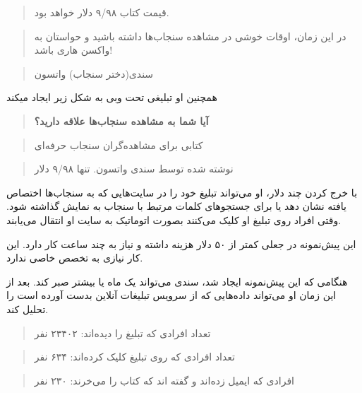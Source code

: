 \begin{quote}
قیمت کتاب ۹/۹۸ دلار خواهد بود.
\end{quote}

\begin{quote}
در این زمان، اوقات خوشی در مشاهده سنجاب‌ها داشته باشید و حواستان به
واکسن هاری باشد!
\end{quote}

\begin{quote}
سندی(دختر سنجاب) واتسون
\end{quote}

همچنین او تبلیغی تحت وبی به شکل زیر ایجاد میکند

\begin{quote}
\textbf{آیا شما به مشاهده سنجاب‌ها علاقه دارید؟}
\end{quote}

\begin{quote}
\end{quote}

\begin{quote}
کتابی برای مشاهده‌گران سنجاب حرفه‌ای
\end{quote}

\begin{quote}
نوشته شده توسط سندی واتسون. تنها ۹/۹۸ دلار
\end{quote}

با خرج کردن چند دلار، او می‌تواند تبلیغ خود را در سایت‌هایی که به
سنجاب‌ها اختصاص یافته نشان دهد یا برای جستجوهای کلمات مرتبط با سنجاب به
نمایش گذاشته شود. وقتی افراد روی تبلیغ او کلیک می‌کنند بصورت اتوماتیک به
سایت او انتقال می‌یابند.

این پیش‌نمونه در جعلی کمتر از ۵۰ دلار هزینه داشته و نیاز به چند ساعت کار
دارد. این کار نیازی به تخصص خاصی ندارد.

هنگامی که این پیش‌نمونه ایجاد شد، سندی می‌تواند یک ماه یا بیشتر صبر کند.
بعد از این زمان او می‌تواند داده‌هایی که از سرویس تبلیغات آنلاین بدست
آورده است را تحلیل کند.

\begin{quote}
تعداد افرادی که تبلیغ را دیده‌اند: ۲۳۴۰۲ نفر
\end{quote}

\begin{quote}
تعداد افرادی که روی تبلیغ کلیک کرده‌اند: ۶۳۴ نفر
\end{quote}

\begin{quote}
افرادی که ایمیل زده‌اند و گفته اند که کتاب را می‌خرند: ۲۳۰ نفر
\end{quote}


